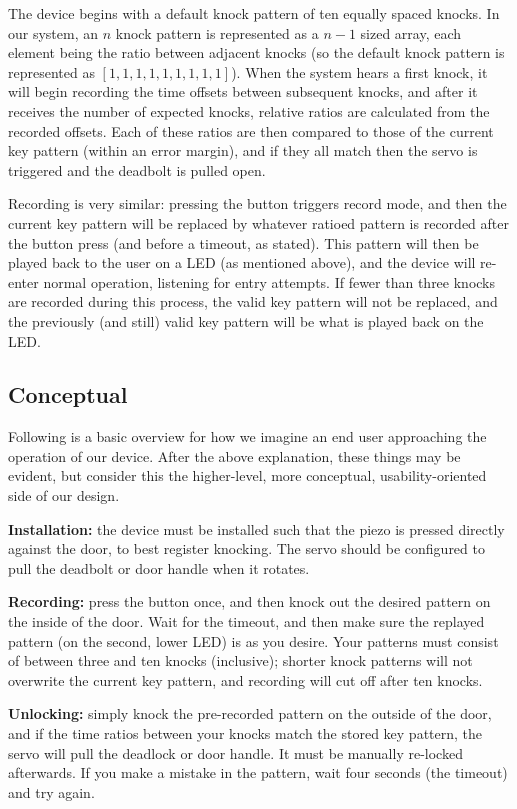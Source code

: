 \documentclass[11pt]{article}			%
\begin{document}
The device begins with a default knock pattern of ten equally spaced knocks. In our system, an $n$ knock pattern is represented as a $n-1$ sized array, each element being the ratio between adjacent knocks (so the default knock pattern is represented as $[1, 1, 1, 1, 1, 1, 1, 1, 1]$). When the system hears a first knock, it will begin recording the time offsets between subsequent knocks, and after it receives the number of expected knocks, relative ratios are calculated from the recorded offsets. Each of these ratios are then compared to those of the current key pattern (within an error margin), and if they all match then the servo is triggered and the deadbolt is pulled open.

Recording is very similar: pressing the button triggers record mode, and then the current key pattern will be replaced by whatever ratioed pattern is recorded after the button press (and before a timeout, as stated). This pattern will then be played back to the user on a LED (as mentioned above), and the device will re-enter normal operation, listening for entry attempts. If fewer than three knocks are recorded during this process, the valid key pattern will not be replaced, and the previously (and still) valid key pattern will be what is played back on the LED.

\subsection{Conceptual}

Following is a basic overview for how we imagine an end user approaching the operation of our device. After the above explanation, these things may be evident, but consider this the higher-level, more conceptual, usability-oriented side of our design. 

\textbf{Installation:} the device must be installed such that the piezo is pressed directly against the door, to best register knocking. The servo should be configured to pull the deadbolt or door handle when it rotates.

\textbf{Recording:} press the button once, and then knock out the desired pattern on the inside of the door. Wait for the timeout, and then make sure the replayed pattern (on the second, lower LED) is as you desire. Your patterns must consist of between three and ten knocks (inclusive); shorter knock patterns will not overwrite the current key pattern, and recording will cut off after ten knocks.

\textbf{Unlocking:} simply knock the pre-recorded pattern on the outside of the door, and if the time ratios between your knocks match the stored key pattern, the servo will pull the deadlock or door handle. It must be manually re-locked afterwards. If you make a mistake in the pattern, wait four seconds (the timeout) and try again.
\end{document}
